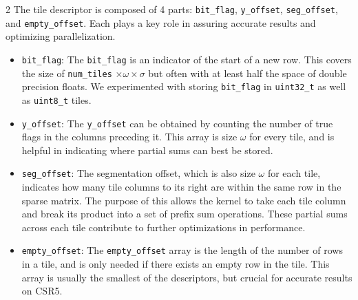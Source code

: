 \documentclass{article}
\begin{document}
\begin{multicols}{2}
The tile descriptor is composed of 4 parts: \texttt{bit\_flag}, \texttt{y\_offset}, \texttt{seg\_offset}, and \texttt{empty\_offset}. Each plays a key role in assuring accurate results and optimizing parallelization.

\begin{itemize}
\item \texttt{bit\_flag}: The \texttt{bit\_flag} is an indicator of the start of a new row. This covers the size of \texttt{num\_tiles} $\times \omega \times \sigma$ but often with at least half the space of double precision floats. We experimented with storing \texttt{bit\_flag} in \texttt{uint32\_t} as well as \texttt{uint8\_t} tiles.

\item \texttt{y\_offset}: The \texttt{y\_offset} can be obtained by counting the number of true flags in the columns preceding it. This array is size $\omega$ for every tile, and is helpful in indicating where partial sums can best be stored.

\item \texttt{seg\_offset}:  The segmentation offset, which is also size $\omega$ for each tile, indicates how many tile columns to its right are within the same row in the sparse matrix. The purpose of this allows the kernel to take each tile column and break its product into a set of prefix sum operations. These partial sums across each tile contribute to further optimizations in performance.   

\item \texttt{empty\_offset}: The \texttt{empty\_offset} array is the length of the number of rows in a tile, and is only needed if there exists an empty row in the tile. This array is usually the smallest of the descriptors, but crucial for accurate results on CSR5.

\end{itemize}



\end{multicols}
\end{document}
